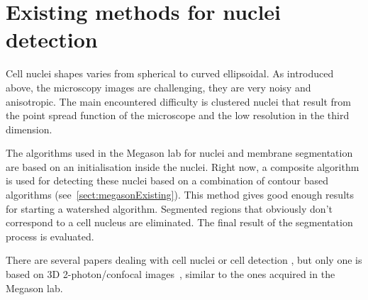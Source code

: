 \section{Existing methods for nuclei detection}

Cell nuclei shapes varies from spherical to curved ellipsoidal. As introduced above, the microscopy images are challenging, they are very noisy and anisotropic.
The main encountered difficulty is clustered nuclei that result from the point spread function of the microscope and the low resolution in the third dimension.

The algorithms used in the Megason lab for nuclei and membrane segmentation are based on an initialisation inside the nuclei.
Right now, a composite algorithm is used for detecting these nuclei based on a combination of contour based algorithms (see~\ref{sect:megasonExisting}).
This method gives good enough results for starting a watershed algorithm. Segmented regions that obviously don't correspond to a cell nucleus are eliminated. The final result of the segmentation process is evaluated.

There are several papers dealing with cell nuclei or cell detection 
\cite{loukas2003image,umesh2001efficient,al2009improved},
but only one is based on 3D 2-photon/confocal images~\cite{li20073},
similar to the ones acquired in the Megason lab.

